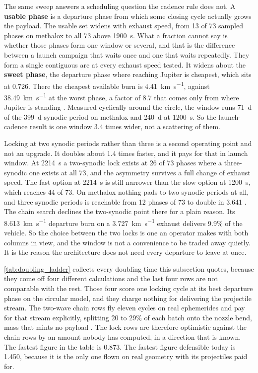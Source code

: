 \documentclass{article}
\begin{document}
The same sweep answers a scheduling question the cadence rule does not. A \textbf{usable phase} is a departure phase from which some closing cycle actually grows the payload. The usable set widens with exhaust speed, from 13 of 73 sampled phases on methalox to all 73 above \SI{1900}{\second}. What a fraction cannot say is whether those phases form one window or several, and that is the difference between a launch campaign that waits once and one that waits repeatedly. They form a single contiguous arc at every exhaust speed tested. It widens about the \textbf{sweet phase}, the departure phase where reaching Jupiter is cheapest, which sits at \num{0.726}. There the cheapest available burn is \SI{4.41}{\kilo\meter\per\second}, against \SI{38.49}{\kilo\meter\per\second} at the worst phase, a factor of \num{8.7} that comes only from where Jupiter is standing \cite{Katz_aim_is_all_you_need_2025}. Measured cyclically around the circle, the window runs \SI{71}{\day} of the \SI{399}{\day} synodic period on methalox and \SI{240}{\day} at \SI{1200}{\second}. So the launch-cadence result is one window \num{3.4} times wider, not a scattering of them.

Locking at two synodic periods rather than three is a second operating point and not an upgrade. It doubles about \num{1.4} times faster, and it pays for that in launch window. At \SI{2214}{\second} a two-synodic lock exists at 26 of 73 phases where a three-synodic one exists at all 73, and the asymmetry survives a full change of exhaust speed. The fast option at \SI{2214}{\second} is still narrower than the slow option at \SI{1200}{\second}, which reaches 44 of 73. On methalox nothing pads to two synodic periods at all, and three synodic periods is reachable from 12 phases of 73 to double in \SI{3.641}{\year} \cite{Katz_aim_is_all_you_need_2025}. The chain search declines the two-synodic point there for a plain reason. Its \SI{8.613}{\kilo\meter\per\second} departure burn on a \SI{3.727}{\kilo\meter\per\second} exhaust delivers 9.9\% of the vehicle. So the choice between the two locks is one an operator makes with both columns in view, and the window is not a convenience to be traded away quietly. It is the reason the architecture does not need every departure to leave at once.

\autoref{tab:doubling_ladder} collects every doubling time this subsection quotes, because they come off four different calculations and the last four rows are not comparable with the rest. Those four score one locking cycle at its best departure phase on the circular model, and they charge nothing for delivering the projectile stream. The two-wave chain rows fly eleven cycles on real ephemerides and pay for that stream explicitly, splitting 20 to 29\% of each batch onto the nozzle bend, mass that mints no payload \cite{Katz_aim_is_all_you_need_2025}. The lock rows are therefore optimistic against the chain rows by an amount nobody has computed, in a direction that is known. The fastest figure in the table is \SI{0.873}{\year}. The fastest figure defensible today is \SI{1.450}{\year}, because it is the only one flown on real geometry with its projectiles paid for.
\end{document}
